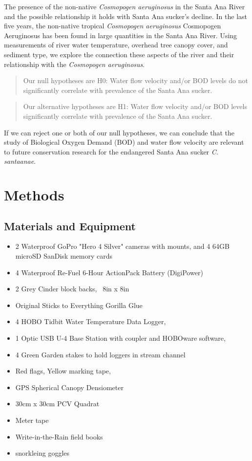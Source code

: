 \documentclass{article}
\begin{document}
The presence of the non-native \emph{Cosmopogen aeruginosus} in the Santa Ana River and the possible relationship it holds with Santa Ana sucker's decline. In the last five years, the non-native tropical \emph{Cosmopogen aeruginosus} Cosmopogen Aeruginosus has been found in large quantities in the Santa Ana River. Using measurements of river water temperature, overhead tree canopy cover, and sediment type, we explore the connection these aspects of the river and their relationship with the \emph{Cosmopogen aeruginosus}.

\begin{quote}
Our null hypotheses are H0: Water flow velocity and/or BOD levels do not significantly correlate with prevalence of the Santa Ana sucker.
\end{quote}
\begin{quote}
Our alternative hypotheses are H1: Water flow velocity and/or BOD levels significantly correlate with prevalence of the Santa Ana sucker.
\end{quote}
If we can reject one or both of our null hypotheses, we can conclude that the study of Biological Oxygen Demand (BOD) and water flow velocity are relevant to future conservation research for the endangered Santa Ana sucker \emph{C. santaanae}.


\section{Methods}

\subsection{Materials and Equipment}
\begin{itemize}
\item 2 Waterproof GoPro "Hero 4 Silver" cameras with mounts, and 4 64GB microSD SanDisk memory cards
\item 4 Waterproof Re-Fuel 6-Hour ActionPack Battery (DigiPower)
\item 2 Grey Cinder block backs, ~8in x 8in
\item Original Sticks to Everything Gorilla Glue
\item 4 HOBO Tidbit Water Temperature Data Logger,
\item 1 Optic USB U-4 Base Station with coupler and HOBOware software,
\item 4 Green Garden stakes to hold loggers in stream channel
\item Red flags, Yellow marking tape,
\item GPS Spherical Canopy Densiometer
\item 30cm x 30cm PCV Quadrat
\item Meter tape
\item Write-in-the-Rain field books
\item snorkleing goggles 
\end{itemize}
\end{document}
